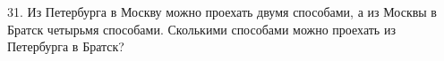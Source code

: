 31. Из Петербурга в Москву можно проехать двумя способами, а из Москвы в Братск четырьмя способами. Сколькими способами можно проехать из Петербурга в Братск?\\
